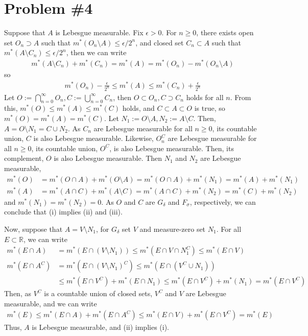 \documentclass{scrartcl}
\begin{document}
\section{Problem \#4}
Suppose that \(A\) is Lebesgue measurable. Fix \(\epsilon > 0\). For \(n \ge
0\), there exists open set \(O_n \supset A\) such that \(m^*(O_n \setminus A)
\le \epsilon / 2^n\), and closed set \(C_n \subset A\) such that \(m^*(A
\setminus C_n) \le \epsilon / 2^n\), then we can write
\begin{align*}
  m^*(A \setminus C_n) + m^*(C_n)
  = m^*(A)
  = m^*(O_n) - m^*(O_n \setminus A)
\end{align*}
so
\begin{align*}
  m^*(O_n) - \frac{\epsilon}{2^n}
  \le m^*(A)
  \le m^*(C_n) + \frac{\epsilon}{2^n}
\end{align*}
Let \(O := \bigcap^\infty_{n = 0} O_n, C := \bigcup^\infty_{n = 0} C_n\), then
\(O \subset O_n, C \supset C_n\) holds for all \(n\). From this, \(m^*(O) \le
m^*(A) \le m^*(C)\) holds, and \(C \subset A \subset O\) is true, so \(m^*(O) =
m^*(A) = m^*(C)\). Let \(N_1 := O \setminus A, N_2 := A \setminus C\). Then,
\(A = O \setminus N_1 = C \cup N_2\). As \(C_n\) are Lebesgue measurable for
all \(n \ge 0\), its countable union, \(C\) is also Lebesgue measurable.
Likewise, \(O^C_n\) are Lebesgue measurable for all \(n \ge 0\), its countable
union, \(O^C\), is also Lebesgue measurable. Then, its complement, \(O\) is
also Lebesgue measurable. Then \(N_1\) and \(N_2\) are Lebesgue measurable,
\begin{align*}
  m^*(O)
  &= m^*(O \cap A) + m^*(O \setminus A)
  = m^*(O \cap A) + m^*(N_1)
  = m^*(A) + m^*(N_1) \\
  m^*(A)
  &= m^*(A \cap C) + m^*(A \setminus C)
  = m^*(A \cap C) + m^*(N_2)
  = m^*(C) + m^*(N_2)
\end{align*}
and \(m^*(N_1) = m^*(N_2) = 0\). As \(O\) and \(C\) are \(G_\delta\) and
\(F_\sigma\), respectively, we can conclude that (i) implies (ii) and (iii).

Now, suppose that \(A = V \setminus N_1\), for \(G_\delta\) set \(V\) and
measure-zero set \(N_1\). For all \(E \subset \mathbb{R}\), we can write
\begin{align*}
  m^*(E \cap A)
  &= m^*(E \cap (V \setminus N_1))
  \le m^*(E \cap V \cap N^C_1)
  \le m^*(E \cap V) \\
  m^*(E \cap A^C)
  &= m^*(E \cap (V \setminus N_1)^C)
  \le m^*(E \cap (V^C \cup N_1)) \\
  &\le m^*(E \cap V^C) + m^*(E \cap N_1)
  \le m^*(E \cap V^C) + m^*(N_1)
  = m^*(E \cap V^C)
\end{align*}
Then, as \(V^C\) is a countable union of closed sets, \(V^C\) and \(V\) are
Lebesgue measurable, and we can write
\begin{align*}
  m^*(E)
  \le m^*(E \cap A) + m^*(E \cap A^C)
  \le m^*(E \cap V) + m^*(E \cap V^C)
  = m^*(E)
\end{align*}
Thus, \(A\) is Lebesgue measurable, and (ii) implies (i).
\end{document}
